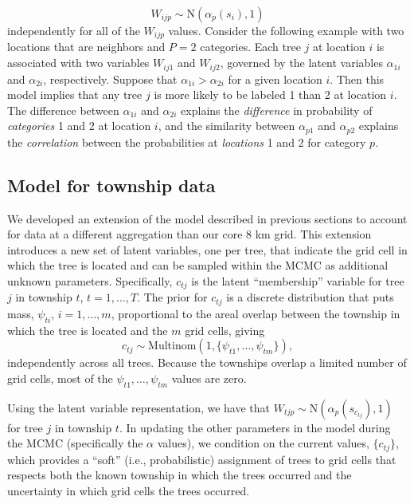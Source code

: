 \documentclass[12pt]{article}
\begin{document}
\noindent 
\[
W_{ijp}\sim\mbox{N}(\alpha_{p}(s_{i}),1)
\]
independently for all of the $W_{ijp}$ values. Consider the following
example with two locations that are neighbors and $P=2$ categories.
Each tree $j$ at location $i$ is associated with two variables $W_{ij1}$
and $W_{ij2}$, governed by the latent variables $\alpha_{1i}$ and
$\alpha_{2i}$, respectively. Suppose that $\alpha_{1i}>\alpha_{2i}$
for a given location $i$. Then this model implies that any tree $j$
is more likely to be labeled 1 than 2 at location $i$. The difference
between $\alpha_{1i}$ and $\alpha_{2i}$ explains the \textit{difference}
in probability of \textit{categories} 1 and 2 at location $i$, and
the similarity between $\alpha_{p1}$ and $\alpha_{p2}$ explains
the \textit{correlation} between the probabilities at \textit{locations}
1 and 2 for category $p$.

\noindent 



\noindent 


\subsection{Model for township data\label{sub:Model-for-township}}

We developed an extension of the model described in previous sections
to account for data at a different aggregation than our core 8 km
grid. This extension introduces a new set of latent variables, one
per tree, that indicate the grid cell in which the tree is located
and can be sampled within the MCMC as additional unknown parameters.
Specifically, $c_{tj}$ is the latent ``membership'' variable for
tree $j$ in township $t$, $t=1,\ldots,T$. The prior for $c_{tj}$
is a discrete distribution that puts mass, $\psi_{ti}$, $i=1,\ldots,m$,
proportional to the areal overlap between the township in which the
tree is located and the $m$ grid cells, giving 
\[
c_{tj}\sim\mbox{Multinom}(1,\{\psi_{t1},\ldots,\psi_{tm}\}),
\]
independently across all trees. Because the townships overlap a limited
number of grid cells, most of the $\psi_{t1},\ldots,\psi_{tm}$ values
are zero.

Using the latent variable representation, we have that $W_{tjp}\sim\mbox{N}(\alpha_{p}(s_{c_{tj}}),1)$
for tree $j$ in township $t$. In updating the other parameters in
the model during the MCMC (specifically the $\alpha$ values), we
condition on the current values, $\{c_{tj}\}$, which provides a ``soft''
(i.e., probabilistic) assignment of trees to grid cells that respects
both the known township in which the trees occurred and the uncertainty
in which grid cells the trees occurred.
\end{document}
